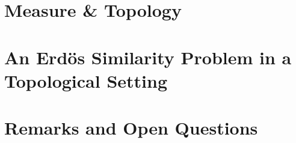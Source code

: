 \documentclass[12pt,oneside]{sfsuthesis}
\begin{document}
\thesistitle





\chapter{Measure \& Topology}




\chapter{An Erd\"{o}s Similarity Problem in a Topological Setting}



\chapter{Remarks and Open Questions}



\printbibliography
\end{document}

